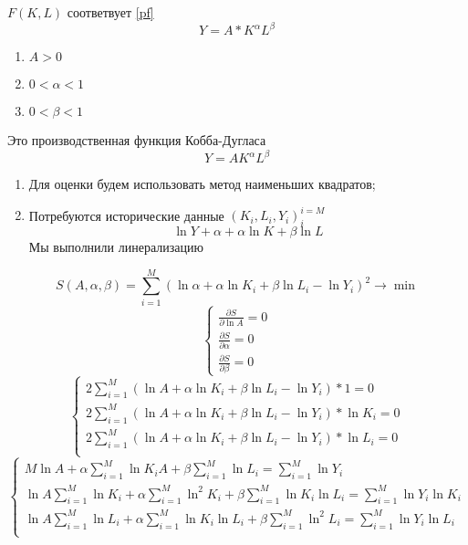 \documentclass[14pt]{extarticle}
\begin{document}
$F(K,L)$ соответвует \ref{pf}
\begin{equation}
Y = A* K^{\alpha} L^{\beta}
\end{equation} 
\begin{enumerate}
	\item $A > 0$
	\item  $0 < \alpha < 1$
	\item  $0 < \beta < 1$
\end{enumerate}
Это производственная функция Кобба-Дугласа
\begin{equation}
Y = A K^{\alpha} L^{\beta}
\end{equation} 
\begin{enumerate}
	\item Для оценки будем использовать метод наименьших квадратов;
	\item Потребуются исторические данные $(K_{i},L_{i},Y_{i})_{i}^{i = M}$ 
	\begin{equation}
		\ln{Y} + \alpha + \alpha\ln{K} + \beta \ln{L}
	\end{equation} 
	Мы выполнили линерализацию
\end{enumerate}
\begin{equation}
S(A,\alpha,\beta) = 
\sum_{i = 1}^{M} \left(\ln \alpha + \alpha \ln K_{i} + \beta \ln L_{i} -
\ln Y_{i}\right)^2  \to \min
\end{equation} 
\begin{equation}
	\begin{cases}
	\frac{\partial S}{\partial \ln A} = 0\\
	\frac{\partial S}{\partial \alpha}  = 0\\
	\frac{\partial S}{\partial \beta}  = 0
	\end{cases}
\end{equation} 
\begin{equation}
\begin{cases}
	2\sum_{i = 1}^{M} (\ln{A} + \alpha \ln{K_{i}} +
	\beta \ln L_{i}  - \ln Y_{i})*1 = 0\\
	2 \sum_{i = 1}^{M} (\ln A + \alpha \ln K_{i} + \beta
	\ln L_{i} -  \ln Y_{i}) * \ln K_{i} = 0\\
	2 \sum_{i = 1}^{M} (\ln A + \alpha \ln K_{i} + \beta
	\ln L_{i} -  \ln Y_{i}) * \ln L_{i} = 0\\
\end{cases}
\end{equation} 
\begin{equation}
\begin{cases}
	M \ln A + \alpha \sum_{i =1}^{M} \ln K_{i}A + 
	\beta \sum_{i=1}^{M} \ln L_{i} = \sum_{i=1}^{M} \ln{Y_{i}}\\
	\ln A \sum_{i=1}^{M} \ln K_{i} +
	\alpha \sum_{i =1}^{M} \ln^2 K_{i} +
	\beta \sum_{i = 1}^{M} \ln K_{i} \ln L_{i} = \sum_{i=1}^{M} \ln Y_{i} \ln K_{i}\\
	\ln A \sum_{i=1}^{M} \ln L_{i} + 
	\alpha \sum_{i=1}^{M}\ln K_{i} \ln L_{i} +
	\beta \sum_{i=1}^{M} \ln^2 L_{i} =
	\sum_{i =1}^{M} \ln{Y_{i}}\ln L_{i}\\
\end{cases}
\end{equation} 
\end{document}
